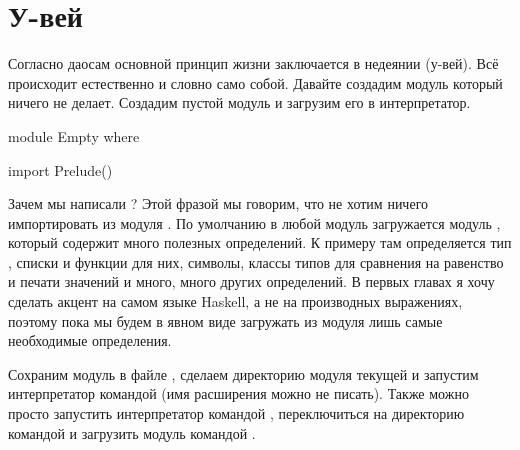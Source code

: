 




\smallskip

\section{У-вей}

Согласно даосам основной принцип жизни заключается 
в недеянии (у-вей). Всё происходит естественно и словно само собой.
Давайте создадим модуль который ничего не делает. Создадим
пустой модуль и загрузим его в интерпретатор.

\begin{code}
module Empty where

import Prelude()
\end{code}

Зачем мы написали ? Этой фразой мы говорим,
что не хотим ничего импортировать из модуля .
По умолчанию в любой модуль загружается модуль ,
который содержит много полезных определений. К примеру там
определяется тип , списки и функции для них, 
символы, классы типов для сравнения на равенство и печати 
значений и много, много других определений. В первых
главах я хочу сделать акцент на самом языке Haskell, а не
на производных выражениях, поэтому пока мы будем в явном
виде загружать из модуля  лишь самые необходимые 
определения.


Сохраним модуль в файле , 
сделаем директорию модуля текущей и запустим интерпретатор
командой  (имя расширения можно не писать).
Также можно просто запустить интерпретатор командой
, переключиться на директорию командой  
и загрузить модуль командой .




